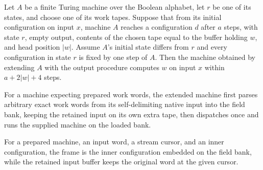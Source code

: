 \begin{lemma}
\label{Complexity.clOutput_compute}
\leanok
{}
Let $A$ be a finite Turing machine over the Boolean alphabet, let $r$ be one of its
states, and choose one of its work tapes. Suppose that from its initial configuration on
input $x$, machine $A$ reaches a configuration $d$ after $a$ steps, with state $r$,
empty output, contents of the chosen tape equal to the buffer holding $w$, and head
position $|w|$. Assume $A$'s initial state differs from $r$ and every configuration in
state $r$ is fixed by one step of $A$. Then the machine obtained by extending $A$ with
the output procedure computes $w$ on input $x$ within $a+2|w|+4$ steps.
\end{lemma}

\begin{definition}
\label{Complexity.clPreparedTM}
\leanok
{}
For a machine expecting prepared work words, the extended machine first parses arbitrary exact work words from its self-delimiting native input into the field bank, keeping the retained input on its own extra tape, then dispatches once and runs the supplied machine on the loaded bank.
\end{definition}

\begin{definition}
\label{Complexity.clPreparedCfg}
\leanok
{}
For a prepared machine, an input word, a stream cursor, and an inner configuration, the frame is the inner configuration embedded on the field bank, while the retained input buffer keeps the original word at the given cursor.
\end{definition}

